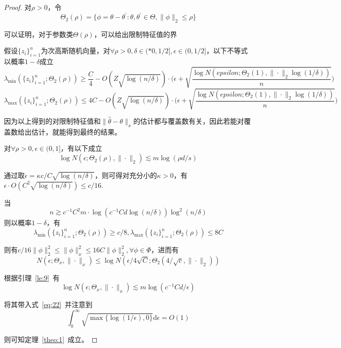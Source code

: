 \begin{proof}
\par
对$\rho > 0$，令
\[
\Theta_2(\rho) = \{\phi = \theta-\theta^\prime: \theta, \theta^\prime \in \Theta, \|\phi\|_2\leq \rho\}
\]
\par
可以证明，对于参数类$\Theta(\rho)$，可以给出限制特征值的界
\begin{lemma}
假设$\{z_i\}_{i=1}^n$为次高斯随机向量，对$\forall \rho > 0, \delta \in (*0,1/2], \epsilon\in (0,1/2]$，以下不等式以概率$1-\delta$成立
\begin{equation}
\lambda_{\min}(\{z_i\}_{i=1}^n; \Theta_2(\rho)) \geq \frac{C}{4}-O(Z\sqrt{\log(n/\delta)})\cdot \big(\epsilon + \sqrt{\frac{\log N(epsilon;\Theta_2(1),\|\cdot\|_2\log(1/\delta))}{n}}\big)
\end{equation}
\begin{equation}
\lambda_{\max}(\{z_i\}_{i=1}^n; \Theta_2(\rho)) \leq 4C-O(Z\sqrt{\log(n/\delta)})\cdot \big(\epsilon + \sqrt{\frac{\log N(epsilon;\Theta_2(1),\|\cdot\|_2\log(1/\delta))}{n}}\big)
\end{equation}
\end{lemma}
\par
因为以上得到的对限制特征值和$\|\hat{\theta}-\theta\|_x$的估计都与覆盖数有关，因此若能对覆盖数给出估计，就能得到最终的结果。


\begin{lemma}\label{le:9}
对$\forall \rho > 0, \epsilon \in (0,1]$，有以下成立
\begin{equation}
\log N(\epsilon; \Theta_2(\rho),\|\cdot\|_2) \lesssim m\log(\rho d/s)
\end{equation}
\end{lemma}

\par
通过取$\epsilon = \kappa c/C\sqrt{\log(n/\delta)}$，则可得对充分小的$\kappa > 0$，有$\epsilon \cdot O(C^2 \sqrt{\log(n/\delta)}) \leq c/16$.
\par
当
\[
	n \gtrsim c^{-1}C^2 m\cdot \log(c^{-1}Cd\log(n/\delta))\log^2(n/\delta)
\]
则以概率$1-\delta$，有
\[
	\lambda_{\min}(\{z_i\}_{i=1}^n; \Theta_2(\rho)) \geq c/8, \lambda_{\max}(\{z_i\}_{i=1}^n; \Theta_2(\rho)) \leq 8C
\]
\par
则有$c/16\|\phi\|_2^2 \leq \|\phi\|_x^2 \leq 16C\|\phi\|_2^2, \forall \phi \in \Phi$，进而有
\[
	N(\epsilon;\Theta_x,\|\cdot\|_x) \leq \log N(\epsilon/4\sqrt{C};\Theta_2(4/\sqrt{c},\|\cdot\|_2))
\]
\par
根据引理~\ref{le:9}~有
\[
\log N(\epsilon;\Theta_x,\|\cdot\|_x) \lesssim m \log(c^{-1}Cd/\epsilon)
\]
\par
将其带入式~\ref{eq:22}~并注意到
\[
	\int_0^\infty \sqrt{\max\{\log(1/\epsilon), 0\}}\mathrm{d}\epsilon = O(1)
\]
\par
则可知定理~\ref{theo:1}~成立。
\end{proof}



